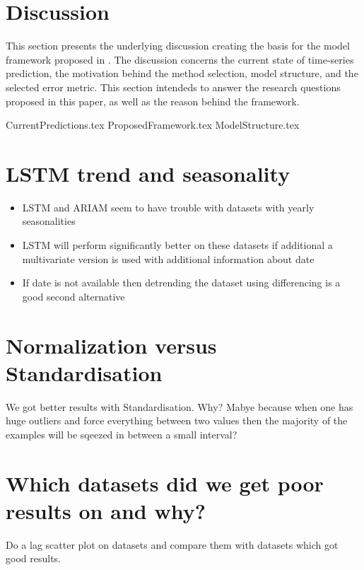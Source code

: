 
\section{Discussion}
\label{section:Discussion:Discussion}


This section presents the underlying discussion creating the basis for the model framework proposed in .
The discussion concerns the current state of time-series prediction, the motivation behind the method selection, model structure, and the selected error metric.
This section intendeds to answer the research questions proposed in this paper,
as well as the reason behind the framework.


{CurrentPredictions.tex}
{ProposedFramework.tex}
{ModelStructure.tex}

\section{LSTM trend and seasonality}
\begin{itemize}
  \item LSTM and ARIAM seem to have trouble with datasets with yearly seasonalities
  \item {LSTM will perform significantly better on these datasets if additional
        a multivariate version is used with additional information about date}
  \item {If date is not available then detrending the dataset using differencing is a good second alternative}
\end{itemize}


\section{Normalization versus Standardisation}
We got better results with Standardisation. Why?
Mabye because when one has huge outliers and force everything between
two values then the majority of the examples will be sqeezed in between a small interval?

\section{Which datasets did we get poor results on and why?}
Do a lag scatter plot on datasets and compare them with datasets which got good results.